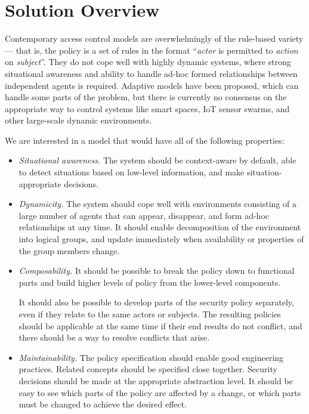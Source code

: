 \chapter{Solution Overview}
\label{overview}

Contemporary access control models are overwhelmingly of the rule-based variety --- that
is, the policy is a set of rules in the format ``\textit{actor} is permitted to
\textit{action} on \textit{subject}''. They do not cope well with highly dynamic
systems, where strong situational awareness and ability to handle ad-hoc formed
relationships between independent agents is required. Adaptive models have been
proposed, which can handle some parts of the problem, but there is currently no
consensus on the appropriate way to control systems like smart spaces, IoT sensor
swarms, and other large-scale dynamic environments.

We are interested in a model that would have all of the following properties:

\begin{itemize}
\item \textit{Situational awareness.} The system should be context-aware by default,
able to detect situations based on low-level information, and make situation-appropriate
decisions.

\item \textit{Dynamicity.} The system should cope well with environments consisting of a
large number of agents that can appear, disappear, and form ad-hoc relationships at any
time. It should enable decomposition of the environment into logical groups, and update
immediately when availability or properties of the group members change.

\item \textit{Composability.} It should be possible to break the policy down to
functional parts and build higher levels of policy from the lower-level components.

It should also be possible to develop parts of the security policy separately, even if
they relate to the same actors or subjects. The resulting policies should be applicable
at the same time if their end results do not conflict, and there should be a way to
resolve conflicts that arise.

\item \textit{Maintainability.} The policy specification should enable good engineering
practices. Related concepts should be specified close together. Security decisions
should be made at the appropriate abstraction level. It should be easy to see which
parts of the policy are affected by a change, or which parts must be changed to achieve
the desired effect.
\end{itemize}

